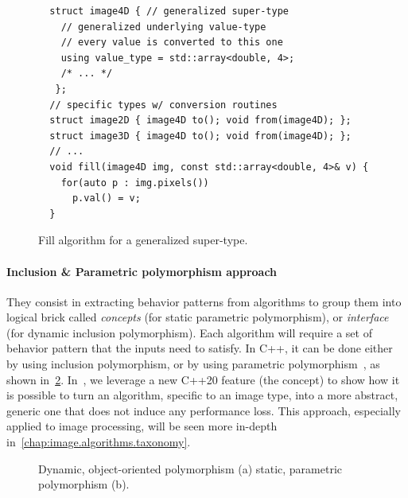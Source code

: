 \begin{figure}[htbp]
  \centering
  \begin{verbatim}
  struct image4D { // generalized super-type
    // generalized underlying value-type
    // every value is converted to this one
    using value_type = std::array<double, 4>;
    /* ... */
   };
  // specific types w/ conversion routines
  struct image2D { image4D to(); void from(image4D); };
  struct image3D { image4D to(); void from(image4D); };
  // ...
  void fill(image4D img, const std::array<double, 4>& v) {
    for(auto p : img.pixels())
      p.val() = v;
  }
  \end{verbatim}
  \caption{Fill algorithm for a generalized super-type.}
  \label{code:gen.generalized}
\end{figure}

\paragraph{Inclusion \& Parametric polymorphism approach} They consist in extracting behavior patterns from algorithms
to group them into logical brick called \emph{concepts} (for static parametric polymorphism), or \emph{interface} (for
dynamic inclusion polymorphism). Each algorithm will require a set of behavior pattern that the inputs need to satisfy.
In C++, it can be done either by using inclusion polymorphism, or by using parametric
polymorphism~\parencite{gibbons.2007.datatype}, as shown in~\cref{code:gen.inclupoly}. In~\parencite{roynard.2019.rrpr},
we leverage a new C++20 feature (the concept) to show how it is possible to turn an algorithm, specific to an image
type, into a more abstract, generic one that does not induce any performance loss. This approach, especially applied to
image processing, will be seen more in-depth in~\cref{chap:image.algorithms.taxonomy}.

\begin{figure}[htb]
  \centering
  \hfil
  \vfil
  \hfil
  \caption{Dynamic, object-oriented polymorphism (a) \vs static, parametric polymorphism (b).}
  \label{code:gen.inclupoly}
\end{figure}

